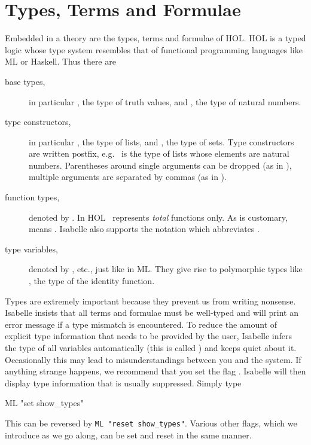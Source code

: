 \section{Types, Terms and Formulae}
\label{sec:TypesTermsForms}

Embedded in a theory are the types, terms and formulae of HOL\@. HOL is a typed
logic whose type system resembles that of functional programming languages
like ML or Haskell. Thus there are
\begin{description}
\item[base types,] 
in particular , the type of truth values,
and , the type of natural numbers.
\item[type constructors,]
 in particular , the type of
lists, and , the type of sets. Type constructors are written
postfix, e.g.\  is the type of lists whose elements are
natural numbers. Parentheses around single arguments can be dropped (as in
), multiple arguments are separated by commas (as in
).
\item[function types,]
denoted by \isasymFun{}.
  In HOL \isasymFun\ represents \emph{total} functions only. As is customary,
   means
  . Isabelle also
  supports the notation 
  which abbreviates .
\item[type variables,]
  denoted by ,  etc., just like in ML\@. They give rise
  to polymorphic types like , the type of the identity
  function.
\end{description}
\begin{warn}
  Types are extremely important because they prevent us from writing
  nonsense.  Isabelle insists that all terms and formulae must be well-typed
  and will print an error message if a type mismatch is encountered. To
  reduce the amount of explicit type information that needs to be provided by
  the user, Isabelle infers the type of all variables automatically (this is
  called ) and keeps quiet about it. Occasionally
  this may lead to misunderstandings between you and the system. If anything
  strange happens, we recommend that you set the flag
  .  
  Isabelle will then display type information
  that is usually suppressed.  Simply type
\begin{ttbox}
ML "set show_types"
\end{ttbox}

\noindent
This can be reversed by \texttt{ML "reset show_types"}. Various other flags,
which we introduce as we go along, can be set and reset in the same manner.%
\end{warn}%



